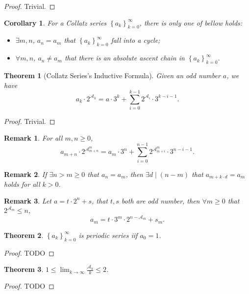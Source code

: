 \documentclass[a4paper,12pt]{article}
\theoremstyle{sltheorem}
\newtheorem{theorem}{Theorem}
\newtheorem{corollary}{Corollary}[theorem]
\newtheorem*{remark}{Remark}
\begin{document}
\begin{proof} Trivial. \end{proof}
\begin{corollary}
    For a Collatz series $\left\{a_k\right\}_{k=0}^{\infty}$, there is only one of bellow holds:
    \begin{itemize}
        \item[1)] $\exists m, n$, $a_n = a_m$ that $\left\{a_k\right\}_{k=0}^{\infty}$ fall into a cycle;
        \item[2)] $\forall m, n$, $a_n \ne a_m$ that there is an absolute ascent chain in $\left\{a_k\right\}_{k=0}^{\infty}$.
    \end{itemize}
\end{corollary}
\begin{theorem}[Collatz Series's Inductive Formula]\label{theorem:inductive-formula}
Given an odd number $a$, we have
\[ a_k \cdot 2^{\mathcal{A}_k} = a \cdot 3 ^ k + \sum_{i = 0}^{k - 1}2^{\mathcal{A}_i}\cdot3^{k-i-1}. \]
\end{theorem}
\begin{proof} Trivial. \end{proof}
\begin{remark}
For all $m,n \ge 0$, 
\[ a_{m+n} \cdot 2^{\mathcal{A}_{m+n}^{m}} = a_m \cdot 3 ^ n + \sum_{i = 0}^{n - 1}2^{\mathcal{A}_{m+i}^{m}}\cdot3^{n-i-1}. \]
\end{remark}
\begin{remark}
    If $\exists n > m \ge 0$ that $a_n = a_m$, 
    then $\exists d \mid (n - m)$ that $a_{m + k \cdot d} = a_{m}$ holds for all $k > 0$.
\end{remark}
\begin{remark}
Let $a = t \cdot 2^{n} + s$, that $t, s$ both are odd number, then $\forall m \ge 0$ that $2^{\mathcal{A}_m} \le n$,
\[a_m = t \cdot 3^{m} \cdot 2 ^{n - \mathcal{A}_m} + s_m.\]
\end{remark}
\begin{theorem}
    $\left\{a_k\right\}_{k=0}^{\infty}$ is periodic series iif $a_0 = 1$.
\end{theorem}
\begin{proof} TODO \end{proof}
\begin{theorem}
    $1 \le \lim_{k\to \infty}\frac{\mathcal{A}_{k}}{k} \le 2$.
\end{theorem}
\begin{proof} TODO \end{proof}
\end{document}
